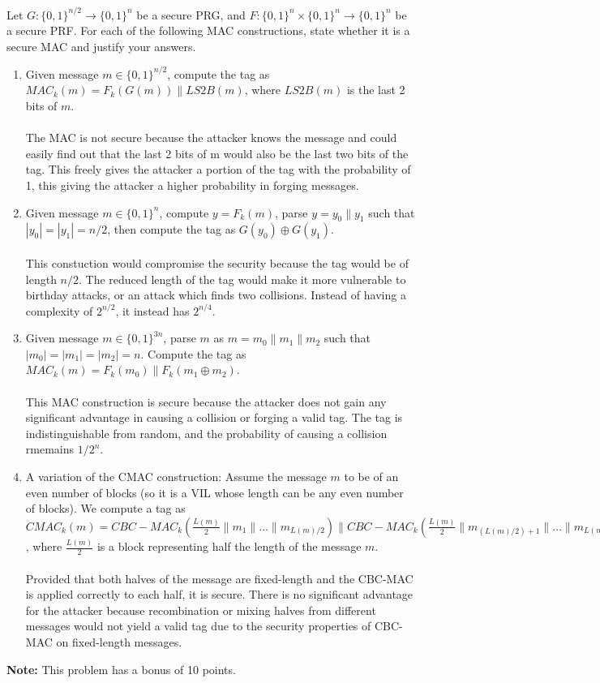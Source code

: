 \documentclass[12pt]{article}
\newcommand{\zo}{\{0,1\}}
\newcommand*\concat{\mathbin{\|}}
\begin{document}
\vspace{12pt}
Let $G:\zo^{n/2} \to \zo^{n}$ be a secure PRG, and $F:\zo^n \times \zo^n \to \zo^n$ be a secure PRF. For each of the following MAC constructions, state whether it is a secure MAC and justify your answers.
\begin{enumerate}
\item Given message $m \in \zo^{n/2}$, compute the tag as $MAC_k(m) = F_k(G(m)) \concat LS2B(m)$, where $LS2B(m)$ is the last 2 bits of $m$.
\\\\The MAC is not secure because the attacker knows the message and could easily find out that the last 2 bits of m would also be the last two bits of the tag. This freely gives the attacker a portion of the tag with the probability of 1, this giving the attacker a higher probability in forging messages. 
\item Given message $m \in \zo^{n}$, compute $y = F_k(m)$, parse $y = y_0 \concat y_1$ such that $|y_0| = |y_1| = n/2$, then compute the tag as $G(y_0)\oplus G(y_1)$.
\\\\This constuction would compromise the security because the tag would be of length $n/2$. The reduced length of the tag would make it more vulnerable to birthday attacks, or an attack which finds two collisions. Instead of having a complexity of \(2^{n/2}\), it instead has \(2^{n/4}\).
\item Given message $m \in \zo^{3n}$, parse $m$ as $m = m_0 \concat m_1 \concat m_2$ such that $|m_0| = |m_1| = |m_2| = n$. Compute the tag as $MAC_k(m) = F_k(m_0) \concat F_k(m_1 \oplus m_2)$.
\\\\This MAC construction is secure because the attacker does not gain any significant advantage in causing a collision or forging a valid tag. The tag is indistinguishable from random, and the probability of causing a collision rmemains \(1/2^n\).
\item A variation of the CMAC construction: Assume the message $m$ to be of an even number of blocks (so it is a VIL whose length can be any even number of blocks). We compute a tag as $CMAC_k(m) = CBC-MAC_k(\frac{L(m)}{2} \concat m_1 \concat \dots \concat m_{L(m)/2}) \concat CBC-MAC_k(\frac{L(m)}{2} \concat m_{(L(m)/2) + 1} \concat \dots \concat m_{L(m)})$, where $\frac{L(m)}{2}$ is a block representing half the length of the message $m$.
\\\\Provided that both halves of the message are fixed-length and the CBC-MAC is applied correctly to each half, it is secure. There is no significant advantage for the attacker because recombination or mixing halves from different messages would not yield a valid tag due to the security properties of CBC-MAC on fixed-length messages.
\end{enumerate} 

\noindent\textbf{Note:} This problem has a bonus of 10 points.
\end{document}
